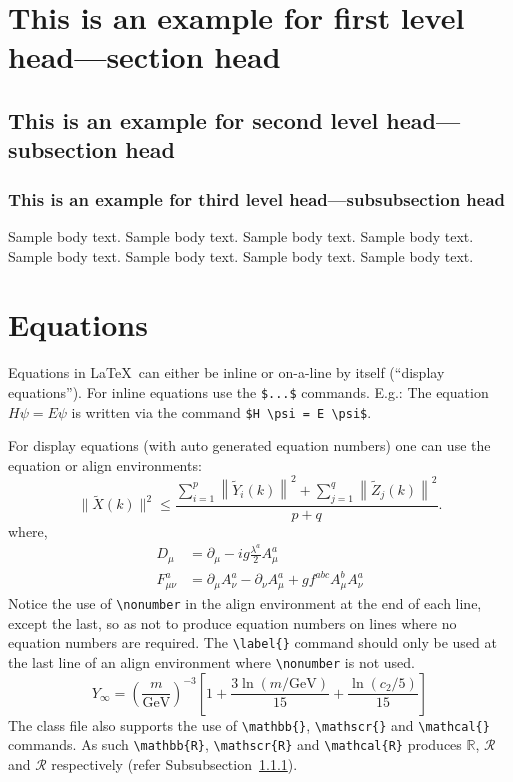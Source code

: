 \documentclass{svproc}
\begin{document}
\section{This is an example for first level head---section head}\label{sec3}

\subsection{This is an example for second level head---subsection head}\label{subsec2}

\subsubsection{This is an example for third level head---subsubsection head}\label{subsubsec2}

Sample body text. Sample body text. Sample body text. Sample body text. Sample body text. Sample body text. Sample body text. Sample body text. 

\section{Equations}\label{sec4}

Equations in \LaTeX\ can either be inline or on-a-line by itself (``display equations''). For
inline equations use the \verb+$...$+ commands. E.g.: The equation
$H\psi = E \psi$ is written via the command \verb+$H \psi = E \psi$+.

For display equations (with auto generated equation numbers)
one can use the equation or align environments:
\begin{equation}
\|\tilde{X}(k)\|^2 \leq\frac{\sum\limits_{i=1}^{p}\left\|\tilde{Y}_i(k)\right\|^2+\sum\limits_{j=1}^{q}\left\|\tilde{Z}_j(k)\right\|^2 }{p+q}.\label{eq1}
\end{equation}
where,
\begin{align}
D_\mu &=  \partial_\mu - ig \frac{\lambda^a}{2} A^a_\mu \nonumber \\
F^a_{\mu\nu} &= \partial_\mu A^a_\nu - \partial_\nu A^a_\mu + g f^{abc} A^b_\mu A^a_\nu \label{eq2}
\end{align}
Notice the use of \verb+\nonumber+ in the align environment at the end
of each line, except the last, so as not to produce equation numbers on
lines where no equation numbers are required. The \verb+\label{}+ command
should only be used at the last line of an align environment where
\verb+\nonumber+ is not used.
\begin{equation}
Y_\infty = \left( \frac{m}{\textrm{GeV}} \right)^{-3}
    \left[ 1 + \frac{3 \ln(m/\textrm{GeV})}{15}
    + \frac{\ln(c_2/5)}{15} \right]
\end{equation}
The class file also supports the use of \verb+\mathbb{}+, \verb+\mathscr{}+ and
\verb+\mathcal{}+ commands. As such \verb+\mathbb{R}+, \verb+\mathscr{R}+
and \verb+\mathcal{R}+ produces $\mathbb{R}$, $\mathscr{R}$ and $\mathcal{R}$
respectively (refer Subsubsection~\ref{subsubsec2}).
\end{document}
